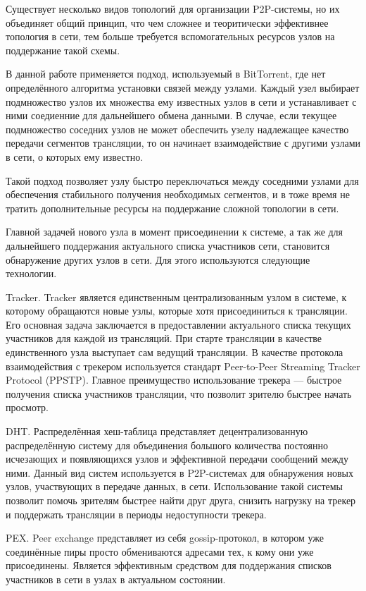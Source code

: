 		Существует несколько видов топологий для организации P2P-системы, но их объединяет общий принцип, что чем
		сложнее и теоритически эффективнее топология в сети, тем больше требуется вспомогательных ресурсов узлов на
		поддержание такой схемы.

		В данной работе применяется подход, используемый в BitTorrent, где нет определённого алгоритма установки связей
		между узлами. Каждый узел выбирает подмножество узлов их множества ему известных узлов в сети и устанавливает с
		ними соедиенние для дальнейшего обмена данными. В случае, если текущее подмножество соседних узлов не может
		обеспечить узелу надлежащее качество передачи сегментов трансляции, то он начинает взаимодействие с другими
		узлами в сети, о которых ему известно.

		Такой подход позволяет узлу быстро переключаться между соседними узлами для обеспечения стабильного получения
		необходимых сегментов, и в тоже время не тратить дополнительные ресурсы на поддержание сложной топологии в сети.

		Главной задачей нового узла в момент присоединении к системе, а так же для дальнейшего поддержания актуального
		списка участников сети, становится обнаружение других узлов в сети. Для этого используются следующие технологии.

		Tracker. Tracker является единственным централизованным узлом в системе, к которому обращаются новые
		узлы, которые хотя присоединиться к трансляции. Его основная задача заключается в предоставлении актуального
		списка текущих участников для каждой из трансляций. При старте трансляции в качестве единственного узла
		выступает сам ведущий трансляции. В качестве протокола взаимодействия с трекером используется стандарт
		Peer-to-Peer Streaming Tracker Protocol (PPSTP). Главное преимущество использование трекера --- быстрое
		получения списка участников трансляции, что позволит зрителю быстрее начать просмотр.

		DHT. Распределённая хеш-таблица представляет децентрализованную распределённую систему для объединения
		большого количества постоянно исчезающих и появляющихся узлов и эффективной передачи сообщений между ними.
		Данный вид систем используется в P2P-системах для обнаружения новых узлов, участвующих в передаче данных, в сети.
		Использование такой системы позволит помочь зрителям быстрее найти друг друга, снизить нагрузку на трекер и
		поддержать трансляции в периоды недоступности трекера.

		PEX. Peer exchange представляет из себя gossip-протокол, в котором уже соединённые пиры просто
		обмениваются адресами тех, к кому они уже присоединены. Является эффективным средством для поддержания списков
		участников в сети в узлах в актуальном состоянии.

